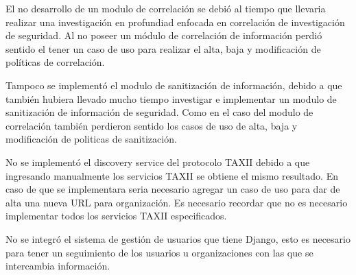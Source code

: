 El no desarrollo de un modulo de correlación se debió al tiempo que llevaria realizar una investigación en profundiad enfocada en correlación de investigación de seguridad. Al no poseer un módulo de correlación de información perdió sentido el tener un caso de uso para realizar el alta, baja y modificación de políticas de correlación.

Tampoco se implementó el modulo de sanitización de información, debido a que también hubiera llevado mucho tiempo investigar e implementar un modulo de sanitización de información de seguridad. Como en el caso del modulo de correlación también perdieron sentido los casos de uso de alta, baja y modificación de politicas de sanitización.

No se implementó el discovery service del protocolo TAXII debido a que ingresando manualmente los servicios TAXII se obtiene el mismo resultado. En caso de que se implementara seria necesario agregar un caso de uso para dar de alta una nueva URL para organización. Es necesario recordar que no es necesario implementar todos los servicios TAXII especificados.

No se integró el sistema de gestión de usuarios que tiene Django, esto es necesario para tener un seguimiento de los usuarios u organizaciones con las que se intercambia información.
